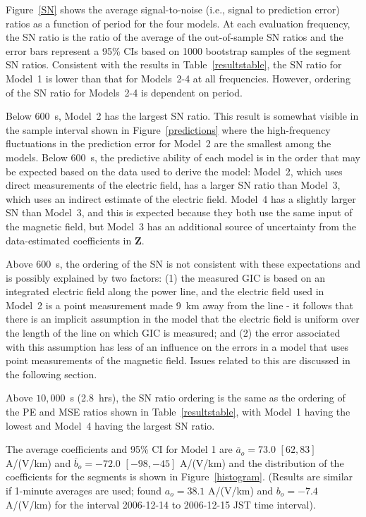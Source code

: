 \documentclass[draft,linenumbers]{agujournal2018}
\begin{document}
Figure~\ref{SN} shows the average signal-to-noise (i.e., signal to prediction error) ratios as a function of period for the four models. At each evaluation frequency, the SN ratio is the ratio of the average of the out-of-sample SN ratios and the error bars represent a 95\% CIs based on 1000 bootstrap samples of the segment SN ratios. Consistent with the results in Table~\ref{resultstable}, the SN ratio for Model~1 is lower than that for Models~2-4 at all frequencies. However, ordering of the SN ratio for Models~2-4 is dependent on period.

Below $600$~s, Model~2 has the largest SN ratio. This result is somewhat visible in the sample interval shown in Figure~\ref{predictions} where the high-frequency fluctuations in the prediction error for Model~2 are the smallest among the models. Below $600$~s, the predictive ability of each model is in the order that may be expected based on the data used to derive the model: Model~2, which uses direct measurements of the electric field, has a larger SN ratio than Model~3, which uses an indirect estimate of the electric field. Model~4 has a slightly larger SN than Model~3, and this is expected because they both use the same input of the magnetic field, but Model~3 has an additional source of uncertainty from the data-estimated coefficients in $\mathbf{Z}$.

Above $600$~s, the ordering of the SN is not consistent with these expectations and is possibly explained by two factors: (1) the measured GIC is based on an integrated electric field along the power line, and the electric field used in Model~2 is a point measurement made 9~km away from the line - it follows that there is an implicit assumption in the model that the electric field is uniform over the length of the line on which GIC is measured; and (2) the error associated with this assumption has less of an influence on the errors in a model that uses point measurements of the magnetic field. Issues related to this are discussed in the following section.

Above $10,000$~s (2.8~hrs), the SN ratio ordering is the same as the ordering of the PE and MSE ratios shown in Table~\ref{resultstable}, with Model~1 having the lowest and Model~4 having the largest SN ratio.

The average coefficients and 95\% CI for Model 1 are $\overline{a}_o = 73.0$ $[62,83]$ A/(V/km) and $\overline{b}_o = -72.0$ $[-98,-45]$ A/(V/km) and the distribution of the coefficients for the segments is shown in Figure~\ref{histogram}. (Results are similar if 1-minute averages are used; \cite{Watari2015} found $a_o=38.1$ A/(V/km) and $b_o=-7.4$ A/(V/km) for the interval 2006-12-14 to 2006-12-15 JST time interval). 
\end{document}
